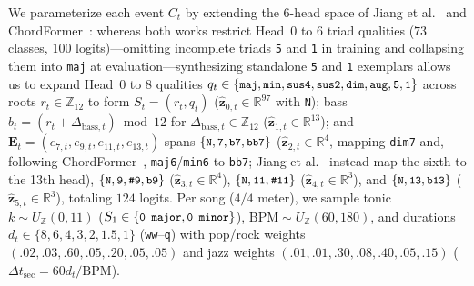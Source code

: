 We parameterize each event $C_t$ by extending the 6-head space of Jiang et al.~\cite{jiang2019large} and ChordFormer~\cite{akram2026chordformer}: whereas both works restrict Head~0 to $6$ triad qualities ($73$ classes, $100$ logits)---omitting incomplete triads {\small\texttt{5}} and {\small\texttt{1}} in training and collapsing them into {\small\texttt{maj}} at evaluation---synthesizing standalone {\small\texttt{5}} and {\small\texttt{1}} exemplars allows us to expand Head~0 to $8$ qualities $q_t \in \{\text{\small\texttt{maj}}, \text{\small\texttt{min}}, \text{\small\texttt{sus4}}, \text{\small\texttt{sus2}}, \text{\small\texttt{dim}}, \text{\small\texttt{aug}}, \text{\small\texttt{5}}, \text{\small\texttt{1}}\}$ across roots $r_t \in \mathbb{Z}_{12}$ to form $S_t = (r_t, q_t)$ ($\hat{\mathbf{z}}_{0,t} \in \mathbb{R}^{97}$ with {\small\texttt{N}}); bass $b_t = (r_t + \Delta_{\text{bass},t}) \bmod 12$ for $\Delta_{\text{bass},t} \in \mathbb{Z}_{12}$ ($\hat{\mathbf{z}}_{1,t} \in \mathbb{R}^{13}$); and $\mathbf{E}_t = (e_{7,t}, e_{9,t}, e_{11,t}, e_{13,t})$ spans $\{\text{\small\texttt{N}}, \text{\small\texttt{7}}, \text{\small\texttt{b7}}, \text{\small\texttt{bb7}}\}$ ($\hat{\mathbf{z}}_{2,t} \in \mathbb{R}^4$, mapping {\small\texttt{dim7}} and, following ChordFormer~\cite{akram2026chordformer}, {\small\texttt{maj6}}/{\small\texttt{min6}} to {\small\texttt{bb7}}; Jiang et al.~\cite{jiang2019large} instead map the sixth to the 13th head), $\{\text{\small\texttt{N}}, \text{\small\texttt{9}}, \text{\small\texttt{\#9}}, \text{\small\texttt{b9}}\}$ ($\hat{\mathbf{z}}_{3,t} \in \mathbb{R}^4$), $\{\text{\small\texttt{N}}, \text{\small\texttt{11}}, \text{\small\texttt{\#11}}\}$ ($\hat{\mathbf{z}}_{4,t} \in \mathbb{R}^3$), and $\{\text{\small\texttt{N}}, \text{\small\texttt{13}}, \text{\small\texttt{b13}}\}$ ($\hat{\mathbf{z}}_{5,t} \in \mathbb{R}^3$), totaling $124$ logits. Per song ($4/4$ meter), we sample tonic $k \sim U_{\mathbb{Z}}(0, 11)$ ($S_1 \in \{\text{\small\texttt{0\_major}}, \text{\small\texttt{0\_minor}}\}$), $\text{BPM} \sim U_{\mathbb{Z}}(60, 180)$, and durations $d_t \in \{8, 6, 4, 3, 2, 1.5, 1\}$ ({\small\texttt{ww}}--{\small\texttt{q}}) with pop/rock weights $(.02, .03, .60, .05, .20, .05, .05)$ and jazz weights $(.01, .01, .30, .08, .40, .05, .15)$ ($\Delta t_{\text{sec}} = 60 d_t / \text{BPM}$).


